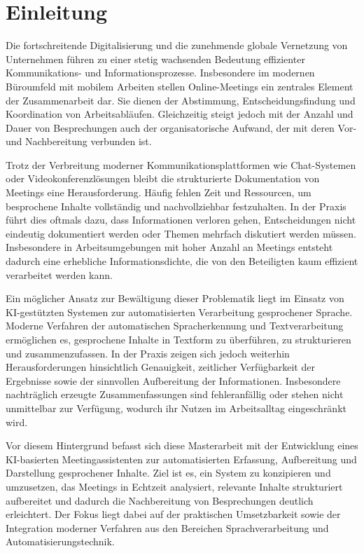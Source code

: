 \chapter{Einleitung}
Die fortschreitende Digitalisierung und die zunehmende globale Vernetzung von Unternehmen führen zu einer stetig wachsenden Bedeutung effizienter Kommunikations- und Informationsprozesse. Insbesondere im modernen Büroumfeld mit mobilem Arbeiten stellen Online-Meetings ein zentrales Element der Zusammenarbeit dar. Sie dienen der Abstimmung, Entscheidungsfindung und Koordination von Arbeitsabläufen. Gleichzeitig steigt jedoch mit der Anzahl und Dauer von Besprechungen auch der organisatorische Aufwand, der mit deren Vor- und Nachbereitung verbunden ist.

Trotz der Verbreitung moderner Kommunikationsplattformen wie Chat-Systemen oder Videokonferenzlösungen bleibt die strukturierte Dokumentation von Meetings eine Herausforderung. Häufig fehlen Zeit und Ressourcen, um besprochene Inhalte vollständig und nachvollziehbar festzuhalten. In der Praxis führt dies oftmals dazu, dass Informationen verloren gehen, Entscheidungen nicht eindeutig dokumentiert werden oder Themen mehrfach diskutiert werden müssen. Insbesondere in Arbeitsumgebungen mit hoher Anzahl an Meetings entsteht dadurch eine erhebliche Informationsdichte, die von den Beteiligten kaum effizient verarbeitet werden kann.

Ein möglicher Ansatz zur Bewältigung dieser Problematik liegt im Einsatz von KI-gestützten Systemen zur automatisierten Verarbeitung gesprochener Sprache. Moderne Verfahren der automatischen Spracherkennung und Textverarbeitung ermöglichen es, gesprochene Inhalte in Textform zu überführen, zu strukturieren und zusammenzufassen. In der Praxis zeigen sich jedoch weiterhin Herausforderungen hinsichtlich Genauigkeit, zeitlicher Verfügbarkeit der Ergebnisse sowie der sinnvollen Aufbereitung der Informationen. Insbesondere nachträglich erzeugte Zusammenfassungen sind fehleranfällig oder stehen nicht unmittelbar zur Verfügung, wodurch ihr Nutzen im Arbeitsalltag eingeschränkt wird.

\newpage
Vor diesem Hintergrund befasst sich diese Masterarbeit mit der Entwicklung eines KI-basierten Meetingassistenten zur automatisierten Erfassung, Aufbereitung und Darstellung gesprochener Inhalte. Ziel ist es, ein System zu konzipieren und umzusetzen, das Meetings in Echtzeit analysiert, relevante Inhalte strukturiert aufbereitet und dadurch die Nachbereitung von Besprechungen deutlich erleichtert. Der Fokus liegt dabei auf der praktischen Umsetzbarkeit sowie der Integration moderner Verfahren aus den Bereichen Sprachverarbeitung und Automatisierungstechnik.


